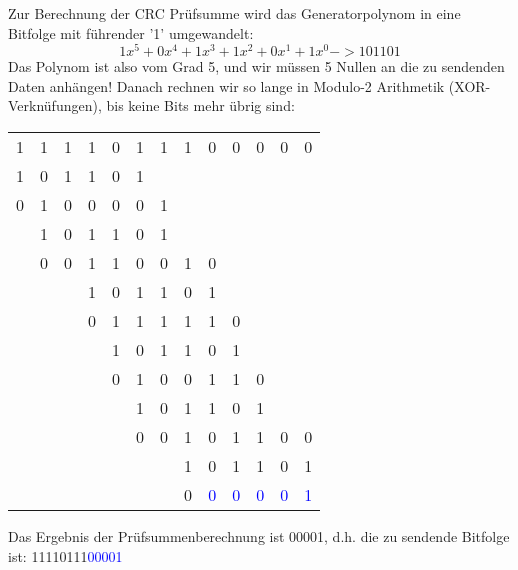 
Zur Berechnung der CRC Prüfsumme wird das Generatorpolynom in eine Bitfolge mit führender '1' umgewandelt:
\[1x^5 + 0x^4 + 1x^3 + 1x^2 + 0x^1 + 1x^0 ->  101101\]
Das Polynom ist also vom Grad 5, und wir müssen 5 Nullen an die zu sendenden Daten anhängen!
Danach rechnen wir so lange in Modulo-2 Arithmetik (XOR-Verknüfungen), bis keine Bits mehr übrig sind:

\begin{center}
    \begin{tabular}{c c c c c c c c c c c c c}
        1 & 1 & 1 & 1 & 0 & 1 & 1 & 1 & 0                   & 0                   & 0                   & 0                   & 0                   \\
        1 & 0 & 1 & 1 & 0 & 1 &   &   &                     &                     &                     &                     &                     \\
        \hline
        0 & 1 & 0 & 0 & 0 & 0 & 1 &   &                     &                     &                     &                     &                     \\
        & 1 & 0 & 1 & 1 & 0 & 1 &   &                     &                     &                     &                     &                     \\
        \hline
        & 0 & 0 & 1 & 1 & 0 & 0 & 1 & 0                   &                     &                     &                     &                     \\
        &   &   & 1 & 0 & 1 & 1 & 0 & 1                   &                     &                     &                     &                     \\
        \hline
        &   &   & 0 & 1 & 1 & 1 & 1 & 1                   & 0                   &                     &                     &                     \\
        &   &   &   & 1 & 0 & 1 & 1 & 0                   & 1                   &                     &                     &                     \\
        \hline
        &   &   &   & 0 & 1 & 0 & 0 & 1                   & 1                   & 0                   &                     &                     \\
        &   &   &   &   & 1 & 0 & 1 & 1                   & 0                   & 1                   &                     &                     \\
        \hline
        &   &   &   &   & 0 & 0 & 1 & 0                   & 1                   & 1                   & 0                   & 0                   \\
        &   &   &   &   &   &   & 1 & 0                   & 1                   & 1                   & 0                   & 1                   \\
        \hline
        &   &   &   &   &   &   & 0 & \textcolor{blue}{0} & \textcolor{blue}{0} & \textcolor{blue}{0} & \textcolor{blue}{0} & \textcolor{blue}{1} \\
    \end{tabular}
\end{center}

Das Ergebnis der Prüfsummenberechnung ist 00001, d.h. die zu sendende Bitfolge ist:
11110111\textcolor{blue}{00001}